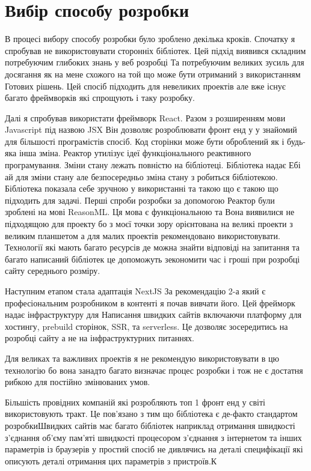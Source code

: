 \newpage
\section{Вибір способу розробки}
В процесі вибору способу розробки було зроблено декілька кроків.
Спочатку я спробував не використовувати сторонніх бібліотек.
Цей підхід виявився складним потребуючим глибоких знань у веб розробці Та потребуючим великих зусиль для досягання
як на мене схожого на той що може бути отриманий з використанням Готових рішень.
Цей спосіб підходить для невеликих проектів але вже існує багато фреймворків які спрощують і таку розробку.

Далі я спробував використати фреймворк React.
Разом з розширенням мови Javascript під назвою JSX Він дозволяє розроблювати фронт енд у у знайомий для більшості програмістів спосіб.
Код сторінки може бути оброблений як і будь-яка інша зміна.
Реактор утилізує ідеї функціонального реактивного програмування. Зміни стану лежать повністю на бібліотеці.
Бібліотека надає Ебі ай для зміни стану але безпосередньо зміна стану з робиться бібліотекою.
Бібліотека показала себе зручною у використанні та такою що є такою що підходить для задачі.
Перші спроби розробки за допомогою Реактор були зроблені на мові ReasonML.
Ця мова є функціональною та Вона виявилися не підходящою для проекту бо з моєї точки зору орієнтована
на великі проекти з великим планшетом а для малих проектів рекомендовано використовувати.
Технології які мають багато ресурсів де можна знайти відповіді на запитання та багато написаний
бібліотек це допоможуть зекономити час і гроші при розробці сайту середнього розміру.

Наступним етапом стала адаптація NextJS За рекомендацію 2-а який є професіональним розробником в контенті я почав вивчати його.
Цей фрейморк надає інфраструктуру для Написання швидких сайтів включаючи платформу для хостингу, prebuild сторінок, SSR, та serverless.
Це дозволяє зосередитись на розробці сайту а не на інфраструктурних питаннях.

Для великах та важливих проектів я не рекомендую використовувати в цю технологію бо вона занадто
багато визначає процес розробки і тож не є достатня рибкою для постійно змінюваних умов.

Більшість провідних компаній які розробляють топ 1 фронт енд у світі використовують тракт.
Це пов'язано з тим що бібліотека є де-факто стандартом розробкиШвидких сайтів має багато
бібліотек наприклад отримання швидкості з'єднання об'єму пам'яті швидкості процесором
з'єднання з інтернетом та інших параметрів із браузерів
у простий спосіб не дивлячись на деталі специфікації які описують деталі отримання цих параметрів з пристроїв.К
